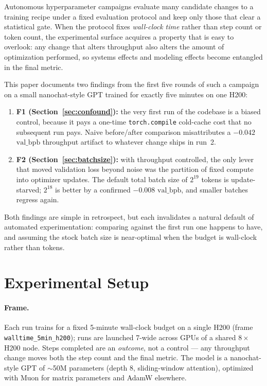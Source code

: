 \documentclass{article}
\newcommand{\valbpb}{\mathrm{val\_bpb}}
\begin{document}
Autonomous hyperparameter campaigns evaluate many candidate changes to a training recipe under a fixed evaluation protocol and keep only those that clear a statistical gate. When the protocol fixes \emph{wall-clock time} rather than step count or token count, the experimental surface acquires a property that is easy to overlook: any change that alters throughput also alters the amount of optimization performed, so systems effects and modeling effects become entangled in the final metric.

This paper documents two findings from the first five rounds of such a campaign on a small nanochat-style GPT \cite{karpathy2025nanochat} trained for exactly five minutes on one H200:

\begin{enumerate}
    \item \textbf{F1 (Section~\ref{sec:confound}):} the very first run of the codebase is a biased control, because it pays a one-time \texttt{torch.compile} cold-cache cost that no subsequent run pays. Naive before/after comparison misattributes a $-0.042$ $\valbpb$ throughput artifact to whatever change ships in run~2.
    \item \textbf{F2 (Section~\ref{sec:batchsize}):} with throughput controlled, the only lever that moved validation loss beyond noise was the partition of fixed compute into optimizer updates. The default total batch size of $2^{19}$ tokens is update-starved; $2^{18}$ is better by a confirmed $-0.008$ $\valbpb$, and smaller batches regress again.
\end{enumerate}

Both findings are simple in retrospect, but each invalidates a natural default of automated experimentation: comparing against the first run one happens to have, and assuming the stock batch size is near-optimal when the budget is wall-clock rather than tokens.

\section{Experimental Setup}
\label{sec:setup}

\paragraph{Frame.} Each run trains for a fixed 5-minute wall-clock budget on a single H200 (frame \texttt{walltime\_5min\_h200}); runs are launched 7-wide across GPUs of a shared $8\times$H200 node. Steps completed are an \emph{outcome}, not a control --- any throughput change moves both the step count and the final metric. The model is a nanochat-style GPT of $\sim$50M parameters (depth 8, sliding-window attention), optimized with Muon for matrix parameters \cite{jordan2024muon} and AdamW elsewhere.
\end{document}
